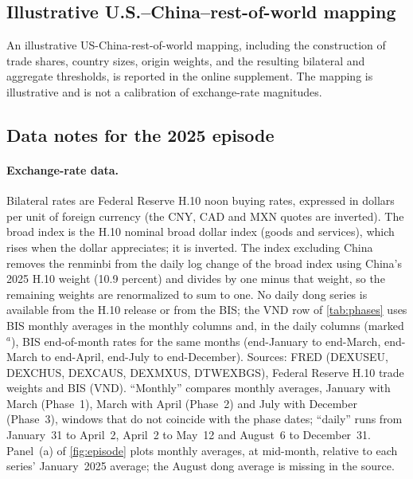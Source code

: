 \subsection{Illustrative U.S.--China--rest-of-world mapping}
\label{app:usmap}

An illustrative US-China-rest-of-world mapping, including the construction of trade shares, country sizes, origin weights, and the resulting bilateral and aggregate thresholds, is reported in the online supplement. The mapping is illustrative and is not a calibration of exchange-rate magnitudes.

\subsection{Data notes for the 2025 episode}
\label{app:episode-data}

\paragraph{Exchange-rate data.} Bilateral rates are Federal Reserve H.10 noon buying rates, expressed in dollars per unit of foreign currency (the CNY, CAD and MXN quotes are inverted). The broad index is the H.10 nominal broad dollar index (goods and services), which rises when the dollar appreciates; it is inverted. The index excluding China removes the renminbi from the daily log change of the broad index using China's 2025 H.10 weight (10.9 percent) and divides by one minus that weight, so the remaining weights are renormalized to sum to one. No daily dong series is available from the H.10 release or from the BIS; the VND row of \cref{tab:phases} uses BIS monthly averages in the monthly columns and, in the daily columns (marked $^{a}$), BIS end-of-month rates for the same months (end-January to end-March, end-March to end-April, end-July to end-December). Sources: FRED (DEXUSEU, DEXCHUS, DEXCAUS, DEXMXUS, DTWEXBGS), Federal Reserve H.10 trade weights and BIS (VND). ``Monthly'' compares monthly averages, January with March (Phase~1), March with April (Phase~2) and July with December (Phase~3), windows that do not coincide with the phase dates; ``daily'' runs from January~31 to April~2, April~2 to May~12 and August~6 to December~31. Panel~(a) of \cref{fig:episode} plots monthly averages, at mid-month, relative to each series' January~2025 average; the August dong average is missing in the source.

